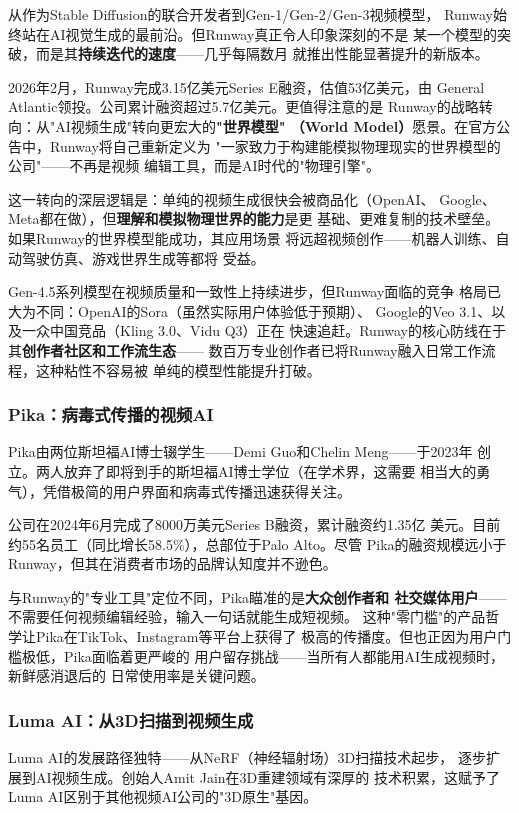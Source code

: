 从作为Stable Diffusion的联合开发者到Gen-1/Gen-2/Gen-3视频模型，
Runway始终站在AI视觉生成的最前沿。但Runway真正令人印象深刻的不是
某一个模型的突破，而是其\textbf{持续迭代的速度}——几乎每隔数月
就推出性能显著提升的新版本。

2026年2月，Runway完成3.15亿美元Series E融资，估值53亿美元，由
General Atlantic领投。公司累计融资超过5.7亿美元。更值得注意的是
Runway的战略转向：从"AI视频生成"转向更宏大的\textbf{"世界模型"
（World Model）}愿景。在官方公告中，Runway将自己重新定义为
"一家致力于构建能模拟物理现实的世界模型的公司"——不再是视频
编辑工具，而是AI时代的"物理引擎"。

这一转向的深层逻辑是：单纯的视频生成很快会被商品化（OpenAI、
Google、Meta都在做），但\textbf{理解和模拟物理世界的能力}是更
基础、更难复制的技术壁垒。如果Runway的世界模型能成功，其应用场景
将远超视频创作——机器人训练、自动驾驶仿真、游戏世界生成等都将
受益。

Gen-4.5系列模型在视频质量和一致性上持续进步，但Runway面临的竞争
格局已大为不同：OpenAI的Sora（虽然实际用户体验低于预期）、
Google的Veo 3.1、以及一众中国竞品（Kling 3.0、Vidu Q3）正在
快速追赶。Runway的核心防线在于其\textbf{创作者社区和工作流生态}——
数百万专业创作者已将Runway融入日常工作流程，这种粘性不容易被
单纯的模型性能提升打破。

\subsubsection{Pika：病毒式传播的视频AI}
Pika由两位斯坦福AI博士辍学生——Demi Guo和Chelin Meng——于2023年
创立。两人放弃了即将到手的斯坦福AI博士学位（在学术界，这需要
相当大的勇气），凭借极简的用户界面和病毒式传播迅速获得关注。

公司在2024年6月完成了8000万美元Series B融资，累计融资约1.35亿
美元。目前约55名员工（同比增长58.5\%），总部位于Palo Alto。尽管
Pika的融资规模远小于Runway，但其在消费者市场的品牌认知度并不逊色。

与Runway的"专业工具"定位不同，Pika瞄准的是\textbf{大众创作者和
社交媒体用户}——不需要任何视频编辑经验，输入一句话就能生成短视频。
这种"零门槛"的产品哲学让Pika在TikTok、Instagram等平台上获得了
极高的传播度。但也正因为用户门槛极低，Pika面临着更严峻的
用户留存挑战——当所有人都能用AI生成视频时，新鲜感消退后的
日常使用率是关键问题。

\subsubsection{Luma AI：从3D扫描到视频生成}
Luma AI的发展路径独特——从NeRF（神经辐射场）3D扫描技术起步，
逐步扩展到AI视频生成。创始人Amit Jain在3D重建领域有深厚的
技术积累，这赋予了Luma AI区别于其他视频AI公司的"3D原生"基因。

